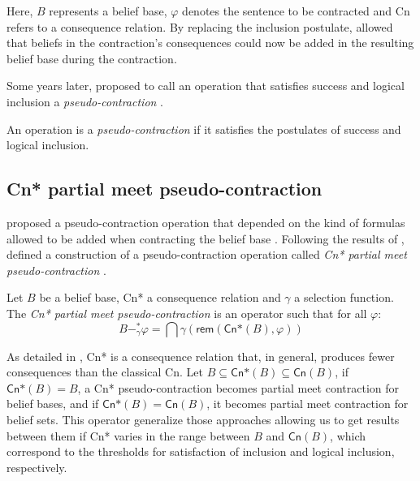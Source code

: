 Here, $B$ represents a belief base, $\varphi$ denotes the sentence to be contracted and \textsf{Cn} refers to a consequence relation. By replacing the inclusion postulate, \citeauthor{Hansson1989} allowed that beliefs in the contraction's consequences could now be added in the resulting belief base during the contraction.

Some years later, \citeauthor{Hansson1993a} proposed to call an operation that satisfies success and logical inclusion a \textit{pseudo-contraction} \citep{Hansson1993a}.

\begin{definition}
    An operation is a \textit{pseudo-contraction} if it satisfies the postulates of success and logical inclusion.
\end{definition}

\subsection{\textsf{Cn*} partial meet pseudo-contraction}

\citeauthor{Santos2016} proposed a pseudo-contraction operation that depended on the kind of formulas allowed to be added when contracting the belief base \citep{Santos2016,Santos2018}. Following the results of \citet{Hansson1993a}, \citeauthor{Santos2016} defined a construction of a pseudo-contraction operation called \textit{\textsf{Cn*} partial meet pseudo-contraction} \citep{Santos2016}.

\begin{definition}
    Let $B$ be a belief base, \textsf{Cn*} a consequence relation and $\gamma$ a selection function. The \textit{\textsf{Cn*} partial meet pseudo-contraction} is an operator such that for all $\varphi$:
    $$B -_{\gamma}^{*} \varphi = \bigcap \gamma(\textsf{rem}(\textsf{Cn*}(B), \varphi))$$
\end{definition}

As detailed in \citet{Santos2018}, \textsf{Cn*} is a consequence relation that, in general, produces fewer consequences than the classical \textsf{Cn}. Let $B \subseteq \textsf{Cn*}(B) \subseteq \textsf{Cn}(B)$, if $\textsf{Cn*}(B) = B$, a \textsf{Cn*} pseudo-contraction becomes partial meet contraction for belief bases, and if $\textsf{Cn*}(B) = \textsf{Cn}(B)$, it becomes partial meet contraction for belief sets. This operator generalize those approaches allowing us to get results between them if \textsf{Cn*} varies in the range between $B$ and $\textsf{Cn}(B)$, which correspond to the thresholds for satisfaction of inclusion and logical inclusion, respectively.

